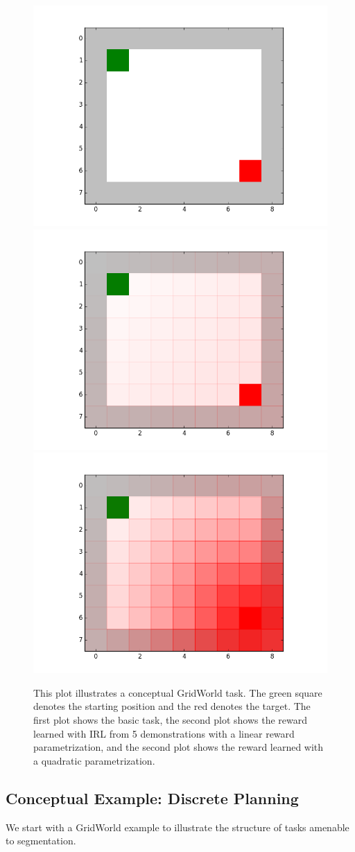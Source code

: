 \begin{figure}[t]
\centering
 \includegraphics[width=0.32\columnwidth]{concept/swirl1-rewards.png}
  \includegraphics[width=0.32\columnwidth]{concept/swirl1-linear.png}
   \includegraphics[width=0.32\columnwidth]{concept/swirl1-quadratic.png}
 \caption{This plot illustrates a conceptual GridWorld task. The green square denotes the starting position and the red denotes the target. The first plot shows the basic task, the second plot shows the reward learned with IRL from 5 demonstrations with a linear reward parametrization, and the second plot shows the reward learned with a quadratic parametrization. \label{concept:1}}
\end{figure}

\subsection{Conceptual Example: Discrete Planning}
We start with a GridWorld example to illustrate the structure of tasks amenable to segmentation. 

